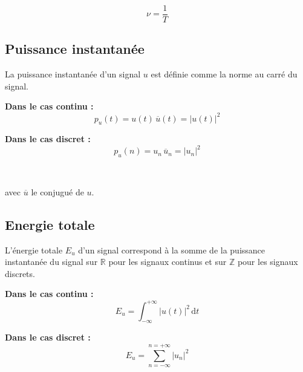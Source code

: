 \begin{equation}
	\nu = \dfrac{1}{T}
\end{equation}

\subsection{Puissance instantanée}

La puissance instantanée d'un signal $u$ est définie comme la norme au carré du signal. \\

\begin{minipage}[t]{0.4\textwidth}
\textbf{Dans le cas continu :} \\
\begin{equation}
p_u(t) = u(t)\,\overline{u}(t) = | u(t) | ^2
\end{equation}
\end{minipage}
\hfill\vline\hfill
\begin{minipage}[t]{0.4\textwidth}
\textbf{Dans le cas discret :} \\
\begin{equation}
p_u(n) = u_n\,\overline{u}_n = | u_n | ^2
\end{equation}
\end{minipage} \\

\vspace{0.5cm}

avec $\overline{u}$ le conjugué de $u$. 

\subsection{Energie totale}

L'énergie totale $E_u$ d'un signal correspond à la somme de la puissance instantanée du signal sur $\mathbb{R}$ pour les signaux continus et sur $\mathbb{Z}$ pour les signaux discrets. \\

\begin{minipage}[t]{0.4\textwidth}
\textbf{Dans le cas continu :} \\
\begin{equation}
E_u = \int_{-\infty}^{+\infty} | u(t) |^2\,\mathrm{d}t
\end{equation}
\end{minipage}
\hfill\vline\hfill
\begin{minipage}[t]{0.4\textwidth}
\textbf{Dans le cas discret :} \\
\begin{equation}
	E_u = \sum_{n=-\infty}^{n=+\infty} |u_n|^2
\end{equation}
\end{minipage} \\

